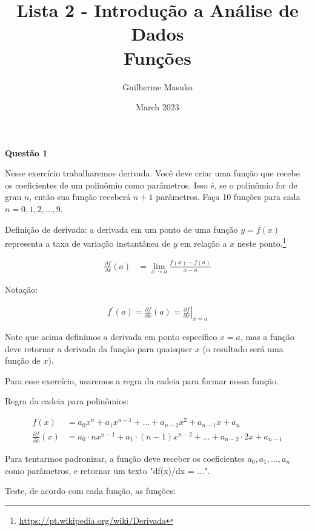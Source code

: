 \documentclass[12pt, a4paper]{article}
\title{Lista 2 - Introdução a Análise de Dados \\
	Funções}
\author{Guilherme Masuko}
\date{March 2023}
\begin{document}
	
\clearpage
\maketitle
\thispagestyle{empty}

\textbf{Questão 1}

Nesse exercício trabalharemos derivada. Você deve criar uma função que recebe os coeficientes de um polinômio como parâmetros. Isso é, se o polinômio for de grau $n$, então sua função receberá $n+1$ parâmetros. Faça 10 funções para cada $n = 0, 1, 2,..., 9$. 

Definição de derivada: a derivada em um ponto de uma função $y = f(x)$ representa a taxa de variação instantânea de $y$ em relação a $x$ neste ponto.\footnote{\url{https://pt.wikipedia.org/wiki/Derivada}}

\begin{align*}
	\frac{\partial f}{\partial x}(a) &= \lim_{x \rightarrow a} \frac{f(x)-f(a)}{x-a}
\end{align*}

Notação:

\begin{align*}
	f^{\prime}(a)=\frac{\partial f}{\partial x}(a)=\left.\frac{\partial f}{\partial x}\right|_{x=a}
\end{align*}

Note que acima definimos a derivada em ponto específico $x=a$, mas a função deve retornar a derivada da função para quaisquer $x$ (o resultado será uma função de $x$).

Para esse exercício, usaremos a regra da cadeia para formar nossa função. 

Regra da cadeia para polinômios:

\begin{align*}
	f(x) &= a_0 x^n + a_{1} x^{n-1} + ... + a_{n-2} x^2 + a_{n-1} x + a_n \\
	\frac{\partial f}{\partial x}(x) &= a_0\cdot n x^{n-1} + a_1\cdot (n-1) x^{n-2} + ... + a_{n-2}\cdot 2 x + a_{n-1}
\end{align*}
	
	
Para tentarmos padronizar, a função deve receber os coeficientes $a_0, a_1, ..., a_n$ como parâmetros, e retornar um texto "df(x)/dx = ...".

Teste, de acordo com cada função, as funções:
\end{document}
